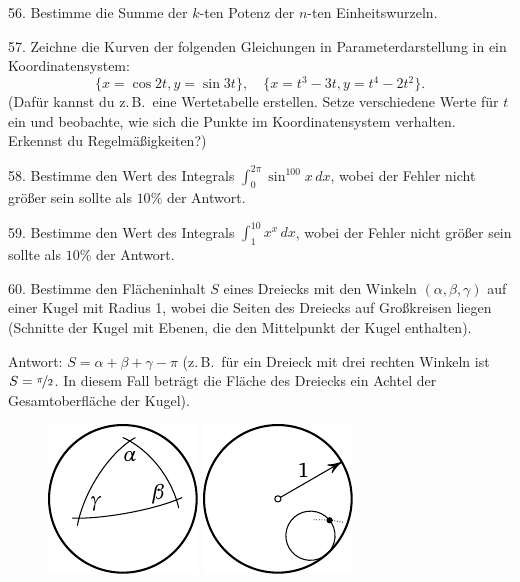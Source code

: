 \begin{problem}{56.}
	Bestimme die Summe der $k$-ten Potenz der $n$-ten Einheitswurzeln.
\end{problem}

\begin{problem}{57.}
	Zeichne die Kurven der folgenden Gleichungen in Parameterdarstellung in ein Koordinatensystem: 
	\begin{equation*}
		\{x=\cos 2t, y=\sin 3t\},\quad 
		\{x=t^3-3t, y=t^4-2t^2\}.
	\end{equation*}
	(Dafür kannst du z.\,B.\ eine Wertetabelle erstellen. Setze verschiedene Werte für $t$ ein und beobachte, wie sich die Punkte im Koordinatensystem verhalten. Erkennst du Regelmäßigkeiten?)
\end{problem}

\begin{problem}{58.}
	Bestimme den Wert des Integrals $\int_0^{2\pi} \sin^{100} x\,dx$, wobei der Fehler nicht größer sein sollte als $10\%$ der Antwort.
\end{problem}

\begin{problem}{59.}
	Bestimme den Wert des Integrals $\int_1^{10} x^x\,dx$, wobei der Fehler nicht größer sein sollte als $10\%$ der Antwort.
\end{problem}

\begin{problem}{60.}
	Bestimme den Flächeninhalt $S$ eines Dreiecks mit den Winkeln $(\alpha, \beta, \gamma)$ auf einer Kugel mit Radius 1, wobei die Seiten des Dreiecks auf Großkreisen liegen (Schnitte der Kugel mit Ebenen, die den Mittelpunkt der Kugel enthalten).

		\begin{note}{Antwort:} $S=\alpha+\beta+\gamma-\pi$ (z.\,B.\ für ein Dreieck mit drei rechten Winkeln ist $S=\nicefrac{\pi}{2}$. In diesem Fall beträgt die Fläche des Dreiecks ein Achtel der Gesamtoberfläche der Kugel).
		\begin{figure}
			\null\hfill
			\includegraphics{taskbook-44}
			\hfill
			\includegraphics{taskbook-45}
			\hfill\null
		\end{figure}
	\end{note}
\end{problem}

